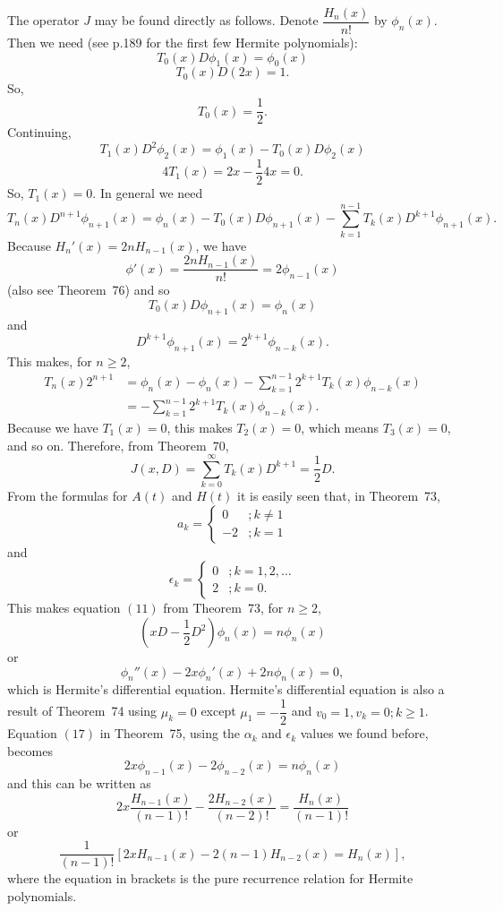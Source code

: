 \begin{solution}
The operator $J$ may be found directly as follows. Denote $\dfrac{H_n(x)}{n!}$ by $\phi_n(x)$. Then we need (see p.189 for the first few Hermite polynomials):
$$T_0(x)D \phi_1(x) = \phi_0(x)$$
$$T_0(x)D(2x)=1.$$
So,
$$T_0(x)=\dfrac{1}{2}.$$
Continuing,
$$T_1(x) D^2 \phi_2(x) = \phi_1(x) - T_0(x) D \phi_2(x)$$
$$4 T_1(x) = 2x - \dfrac{1}{2}4x = 0.$$
So, $T_1(x)=0$. In general we need
$$T_n(x)D^{n+1} \phi_{n+1}(x) = \phi_n(x) - T_0(x)D \phi_{n+1}(x) - \displaystyle\sum_{k=1}^{n-1} T_k(x) D^{k+1} \phi_{n+1}(x).$$
Because $H_n'(x) = 2nH_{n-1}(x)$, we have
$$\phi'(x)=\dfrac{2nH_{n-1}(x)}{n!} = 2\phi_{n-1}(x)$$
(also see Theorem~76) and so 
$$T_0(x) D \phi_{n+1}(x) = \phi_n(x)$$
and
$$D^{k+1} \phi_{n+1}(x) = 2^{k+1} \phi_{n-k}(x).$$
This makes, for $n \geq 2$,
$$\begin{array}{ll}
T_n(x) 2^{n+1} &= \phi_n(x) - \phi_n(x) - \displaystyle\sum_{k=1}^{n-1} 2^{k+1} T_k(x) \phi_{n-k}(x) \\
&= -\displaystyle\sum_{k=1}^{n-1} 2^{k+1} T_k(x) \phi_{n-k}(x).
\end{array}$$
Because we have $T_1(x)=0$, this makes $T_2(x)=0$, which means $T_3(x)=0$, and so on. Therefore, from Theorem~70,
$$J(x,D)=\displaystyle\sum_{k=0}^{\infty} T_k(x) D^{k+1} = \dfrac{1}{2}D.$$
From the formulas for $A(t)$ and $H(t)$ it is easily seen that, in Theorem~73,
$$a_k = \left\{ \begin{array}{ll}
0 &; k \neq 1 \\
-2 &; k=1 
\end{array} \right.$$
and
$$\epsilon_k = \left\{ \begin{array}{ll}
0 &; k=1,2,\ldots \\
2 &; k=0.
\end{array} \right.$$
This makes equation $(11)$ from Theorem~73, for $n \geq 2$,
$$(xD-\dfrac{1}{2}D^2)\phi_n(x) = n\phi_n(x)$$
or
$$\phi_n''(x)-2x\phi_n'(x)+2n\phi_n(x)=0,$$
which is Hermite's differential equation. Hermite's differential equation is also a result of Theorem~74 using $\mu_k=0$ except $\mu_1=-\dfrac{1}{2}$ and $v_0=1, v_k=0; k \geq 1$. Equation $(17)$ in Theorem~75, using the $\alpha_k$ and $\epsilon_k$ values we found before, becomes
$$2x \phi_{n-1}(x) - 2\phi_{n-2}(x) = n\phi_n(x)$$
and this can be written as
$$2x \dfrac{H_{n-1}(x)}{(n-1)!} - \dfrac{2H_{n-2}(x)}{(n-2)!} = \dfrac{H_n(x)}{(n-1)!}$$
or
$$\dfrac{1}{(n-1)!} \left[ 2x H_{n-1}(x) - 2(n-1)H_{n-2}(x)=H_n(x) \right],$$
where the equation in brackets is the pure recurrence relation for Hermite polynomials.
\end{solution}
